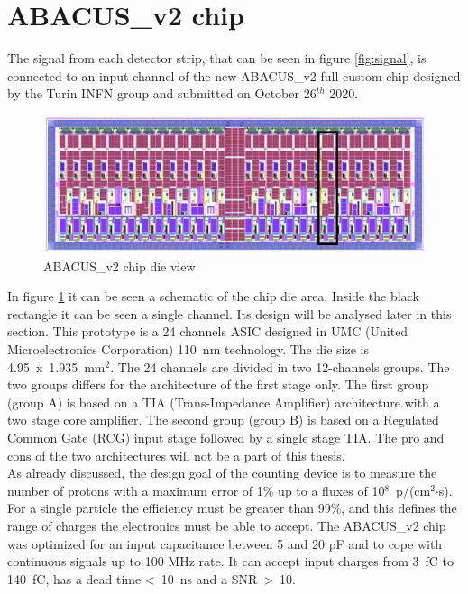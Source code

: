 \section{ABACUS\_v2 chip}\label{chip}
\noindent The signal from each detector strip, that can be seen in figure \ref{fig:signal}, is connected to an input channel of the new ABACUS\_v2 full custom chip\cite{abacus}\cite{dac} designed by the Turin INFN group and submitted on October 26$^{th}$ 2020.
\begin{figure}[H]
	\centering
	\includegraphics[width=0.9\linewidth]{IMG/ch2/ABACUS2.png}
	\caption{ABACUS\_v2 chip die view}
	\label{fig:abacus2}
\end{figure}
\noindent In figure \ref{fig:abacus2} it can be seen a schematic of the chip die area. Inside the black rectangle it can be seen a single channel. Its design will be analysed later in this section.
This prototype is a 24 channels ASIC designed in UMC (United Microelectronics Corporation) 110~nm technology.
The die size is 4.95~x~1.935~mm$^2$.
The 24 channels are divided in two 12-channels groups. The two groups differs for the architecture of the first stage only.
The first group (group A) is based on a TIA (Trans-Impedance Amplifier) architecture with a two stage core amplifier.
The second group (group B) is based on a Regulated Common Gate (RCG) input stage followed by a single stage TIA.
The pro and cons of the two architectures will not be a part of this thesis.\\
As already discussed, the design goal of the counting device is to measure the number of protons with a maximum error of 1\% up to a fluxes of 10$^8$~p/(cm$^2$$\cdot$s).
For a single particle the efficiency must be greater than 99\%, and this defines the range of charges the electronics must be able to accept.
The ABACUS\_v2 chip was optimized for an input capacitance between 5 and 20 pF and to cope with continuous signals up to 100 MHz rate.
It can accept input charges from 3~fC to 140~fC, has a dead time <~10~ns and a SNR~>~10. 

